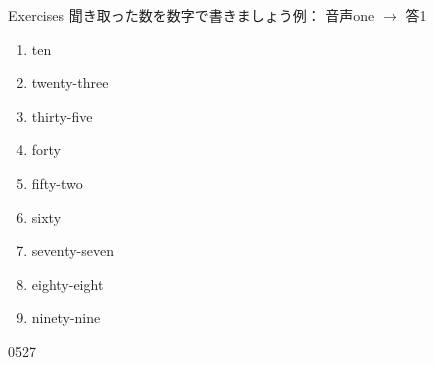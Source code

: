 \documentclass[aspectratio=169,xcolor={dvipsnames,table}]{beamer}
\begin{document}
\begin{frame}[plain]{Exercises}
 聞き取った数を数字で書きましょう\hspace{20pt}例： 音声one $\rightarrow$ 答1
\begin{enumerate}
 \item<2-> ten\hfill{}\hspace{250pt}\mbox{}
 \item<4-> twenty-three\hfill{}\hspace{250pt}\mbox{}
 \item<6-> thirty-five\hfill{}\hspace{250pt}\mbox{}
 \item<8-> forty\hfill{}\hspace{250pt}\mbox{}
 \item<10-> fifty-two\hfill{}\hspace{250pt}\mbox{}
 \item<12-> sixty\hfill{}\hspace{250pt}\mbox{}
 \item<14-> seventy-seven\hfill{}\hspace{250pt}\mbox{}
 \item<16-> eighty-eight\hfill{}\hspace{250pt}\mbox{}
 \item<18-> ninety-nine\hfill{}\hspace{250pt}\mbox{}
\end{enumerate}

{\tiny 0527}{\scriptsize {}}
\end{frame}
\end{document}
